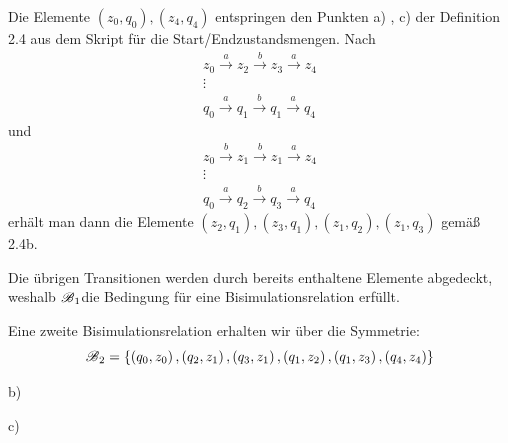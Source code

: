 \documentclass[12pt, paper=a4]{article}
\begin{document}
Die Elemente $\left(z_{0},q_{0}\right),\left(z_{4},q_{4}\right)$
entspringen den Punkten a) , c) der Definition 2.4 aus dem Skript
für die Start/Endzustandsmengen. Nach
\begin{gather*}
z_{0}\stackrel{a}{\rightarrow}z_{2}\stackrel{b}{\rightarrow}z_{3}\stackrel{a}{\rightarrow}z_{4}\\
\vdots\\
q_{0}\stackrel{a}{\rightarrow}q_{1}\stackrel{b}{\rightarrow}q_{1}\stackrel{a}{\rightarrow}q_{4}
\end{gather*}
und
\begin{gather*}
z_{0}\stackrel{b}{\rightarrow}z_{1}\stackrel{b}{\rightarrow}z_{1}\stackrel{a}{\rightarrow}z_{4}\\
\vdots\\
q_{0}\stackrel{a}{\rightarrow}q_{2}\stackrel{b}{\rightarrow}q_{3}\stackrel{a}{\rightarrow}q_{4}
\end{gather*}
erhält man dann die Elemente $\left(z_{2},q_{1}\right),\left(z_{3},q_{1}\right),\left(z_{1},q_{2}\right),\left(z_{1},q_{3}\right)$
gemäß 2.4b.

Die übrigen Transitionen werden durch bereits enthaltene Elemente
abgedeckt, weshalb $\text{\ensuremath{\mathscr{B}}}_{1}$die Bedingung
für eine Bisimulationsrelation erfüllt.

Eine zweite Bisimulationsrelation erhalten wir über die Symmetrie:
\[
\text{\ensuremath{\mathscr{B}}}_{2}=\left\{ \left(q_{0},z_{0}\right),\left(q_{2},z_{1}\right),\left(q_{3},z_{1}\right),\left(q_{1},z_{2}\right),\left(q_{1},z_{3}\right),\left(q_{4},z_{4}\right)\right\} 
\]


b)

c) 
\end{document}

